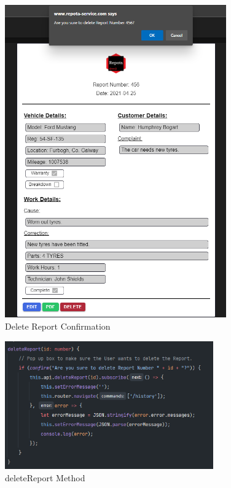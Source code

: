 \begin{figure}[H]
    \centering
    \caption{Delete Report Confirmation}
    \label{image:deleteReportConfirm}
    \includegraphics[width=0.85\textwidth]{images/repota/UI/confirm-delete.png}
\end{figure}

\begin{figure}[H]
    \centering
    \caption{deleteReport Method}
    \label{image:deleteReportMethod}
    \includegraphics[width=0.8\textwidth]{images/repota/report_pages/delete.png}
\end{figure}

